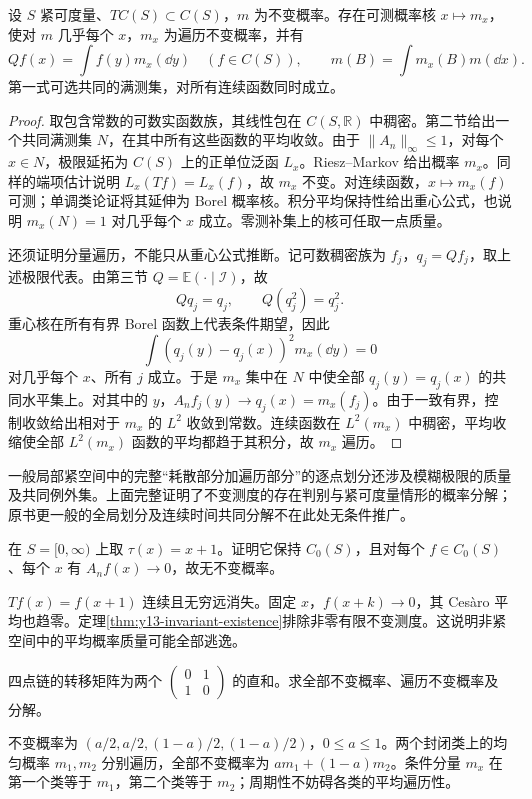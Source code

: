 \begin{theorem}\label{thm:y13-ergodic-decomposition}
设 $S$ 紧可度量、$TC(S)\subset C(S)$，$m$ 为不变概率。存在可测概率核 $x\mapsto m_x$，使对 $m$ 几乎每个 $x$，$m_x$ 为遍历不变概率，并有
\[
 Qf(x)=\int f(y)m_x(\dd y)\quad(f\in C(S)),\qquad
 m(B)=\int m_x(B)m(\dd x).
\]
第一式可选共同的满测集，对所有连续函数同时成立。
\end{theorem}
\begin{proof}
取包含常数的可数实函数族，其线性包在 $C(S,\mathbb R)$ 中稠密。第二节给出一个共同满测集 $N$，在其中所有这些函数的平均收敛。由于 $\|A_n\|_\infty\le1$，对每个 $x\in N$，极限延拓为 $C(S)$ 上的正单位泛函 $L_x$。Riesz--Markov 给出概率 $m_x$。同样的端项估计说明 $L_x(Tf)=L_x(f)$，故 $m_x$ 不变。对连续函数，$x\mapsto m_x(f)$ 可测；单调类论证将其延伸为 Borel 概率核。积分平均保持性给出重心公式，也说明 $m_x(N)=1$ 对几乎每个 $x$ 成立。零测补集上的核可任取一点质量。

还须证明分量遍历，不能只从重心公式推断。记可数稠密族为 $f_j$，$q_j=Qf_j$，取上述极限代表。由第三节 $Q=\mathbb E(\cdot\mid\mathcal I)$，故
\[
 Qq_j=q_j,\qquad Q(q_j^2)=q_j^2.
\]
重心核在所有有界 Borel 函数上代表条件期望，因此
\[
 \int(q_j(y)-q_j(x))^2m_x(\dd y)=0
\]
对几乎每个 $x$、所有 $j$ 成立。于是 $m_x$ 集中在 $N$ 中使全部 $q_j(y)=q_j(x)$ 的共同水平集上。对其中的 $y$，$A_nf_j(y)\to q_j(x)=m_x(f_j)$。由于一致有界，控制收敛给出相对于 $m_x$ 的 $L^2$ 收敛到常数。连续函数在 $L^2(m_x)$ 中稠密，平均收缩使全部 $L^2(m_x)$ 函数的平均都趋于其积分，故 $m_x$ 遍历。
\end{proof}

一般局部紧空间中的完整“耗散部分加遍历部分”的逐点划分还涉及模糊极限的质量及共同例外集。上面完整证明了不变测度的存在判别与紧可度量情形的概率分解；原书更一般的全局划分及连续时间共同分解不在此处无条件推广。

\begin{exercise}[向无穷远逃逸]\label{ex:y13-escape}
在 $S=[0,\infty)$ 上取 $\tau(x)=x+1$。证明它保持 $C_0(S)$，且对每个 $f\in C_0(S)$、每个 $x$ 有 $A_nf(x)\to0$，故无不变概率。
\end{exercise}
\begin{solution}
$Tf(x)=f(x+1)$ 连续且无穷远消失。固定 $x$，$f(x+k)\to0$，其 Ces\`aro 平均也趋零。定理\ref{thm:y13-invariant-existence}排除非零有限不变测度。这说明非紧空间中的平均概率质量可能全部逃逸。
\end{solution}

\begin{exercise}[两个封闭类]\label{ex:y13-closed-classes}
四点链的转移矩阵为两个 $\left(\begin{smallmatrix}0&1\\1&0\end{smallmatrix}\right)$ 的直和。求全部不变概率、遍历不变概率及分解。
\end{exercise}
\begin{solution}
不变概率为 $(a/2,a/2,(1-a)/2,(1-a)/2)$，$0\le a\le1$。两个封闭类上的均匀概率 $m_1,m_2$ 分别遍历，全部不变概率为 $am_1+(1-a)m_2$。条件分量 $m_x$ 在第一个类等于 $m_1$，第二个类等于 $m_2$；周期性不妨碍各类的平均遍历性。
\end{solution}
